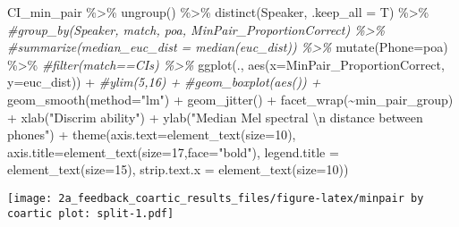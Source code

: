 \documentclass[
]{article}
\newenvironment{Shaded}{\begin{snugshade}}{\end{snugshade}}
\newcommand{\AttributeTok}[1]{\textcolor[rgb]{0.77,0.63,0.00}{#1}}
\newcommand{\CommentTok}[1]{\textcolor[rgb]{0.56,0.35,0.01}{\textit{#1}}}
\newcommand{\DecValTok}[1]{\textcolor[rgb]{0.00,0.00,0.81}{#1}}
\newcommand{\FunctionTok}[1]{\textcolor[rgb]{0.00,0.00,0.00}{#1}}
\newcommand{\NormalTok}[1]{#1}
\newcommand{\SpecialCharTok}[1]{\textcolor[rgb]{0.00,0.00,0.00}{#1}}
\newcommand{\StringTok}[1]{\textcolor[rgb]{0.31,0.60,0.02}{#1}}
\begin{document}
\begin{Shaded}
\begin{Highlighting}[]
\NormalTok{ CI\_min\_pair }\SpecialCharTok{\%\textgreater{}\%}
   \FunctionTok{ungroup}\NormalTok{() }\SpecialCharTok{\%\textgreater{}\%}
   \FunctionTok{distinct}\NormalTok{(Speaker, }\AttributeTok{.keep\_all =}\NormalTok{ T) }\SpecialCharTok{\%\textgreater{}\%}
  \CommentTok{\#group\_by(Speaker, match, poa, MinPair\_ProportionCorrect) \%\textgreater{}\%}
  \CommentTok{\#summarize(median\_euc\_dist = median(euc\_dist)) \%\textgreater{}\%}
  \FunctionTok{mutate}\NormalTok{(}\AttributeTok{Phone=}\NormalTok{poa) }\SpecialCharTok{\%\textgreater{}\%}
  \CommentTok{\#filter(match==\textquotesingle{}CIs\textquotesingle{}) \%\textgreater{}\%}
  \FunctionTok{ggplot}\NormalTok{(., }\FunctionTok{aes}\NormalTok{(}\AttributeTok{x=}\NormalTok{MinPair\_ProportionCorrect, }\AttributeTok{y=}\NormalTok{euc\_dist)) }\SpecialCharTok{+} 
  \CommentTok{\#ylim(5,16) + }
  \CommentTok{\#geom\_boxplot(aes()) + }
  \FunctionTok{geom\_smooth}\NormalTok{(}\AttributeTok{method=}\StringTok{"lm"}\NormalTok{) }\SpecialCharTok{+} 
   \FunctionTok{geom\_jitter}\NormalTok{() }\SpecialCharTok{+}
  \FunctionTok{facet\_wrap}\NormalTok{(}\SpecialCharTok{\textasciitilde{}}\NormalTok{min\_pair\_group) }\SpecialCharTok{+}
  \FunctionTok{xlab}\NormalTok{(}\StringTok{"Discrim ability"}\NormalTok{) }\SpecialCharTok{+} 
  \FunctionTok{ylab}\NormalTok{(}\StringTok{"Median Mel spectral }\SpecialCharTok{\textbackslash{}n}\StringTok{ distance between phones"}\NormalTok{) }\SpecialCharTok{+} 
  \FunctionTok{theme}\NormalTok{(}\AttributeTok{axis.text=}\FunctionTok{element\_text}\NormalTok{(}\AttributeTok{size=}\DecValTok{10}\NormalTok{),}
      \AttributeTok{axis.title=}\FunctionTok{element\_text}\NormalTok{(}\AttributeTok{size=}\DecValTok{17}\NormalTok{,}\AttributeTok{face=}\StringTok{"bold"}\NormalTok{),}
      \AttributeTok{legend.title =} \FunctionTok{element\_text}\NormalTok{(}\AttributeTok{size=}\DecValTok{15}\NormalTok{),}
      \AttributeTok{strip.text.x =} \FunctionTok{element\_text}\NormalTok{(}\AttributeTok{size=}\DecValTok{10}\NormalTok{)) }
\end{Highlighting}
\end{Shaded}

\texttt{[image: 2a\_feedback\_coartic\_results\_files/figure-latex/minpair by coartic plot: split-1.pdf]}
\end{document}
